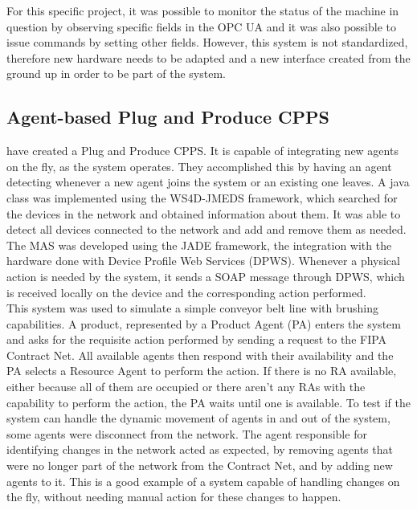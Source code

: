 For this specific project, it was possible to monitor the status of the machine in question by observing specific fields in the OPC UA and it was also possible to issue commands by setting other fields. However, this system is not standardized, therefore new hardware needs to be adapted and a new interface created from the ground up in order to be part of the system.
 
\subsection{Agent-based Plug and Produce CPPS}

\citeauthor{8972169} \cite{8972169} have created a Plug and Produce CPPS. It is capable of integrating new agents on the fly, as the system operates. They accomplished this by having an agent detecting whenever a new agent joins the system or an existing one leaves. A java class was implemented using the WS4D-JMEDS framework, which searched for the devices in the network and obtained information about them. It was able to detect all devices connected to the network and add and remove them as needed.\\

The MAS was developed using the JADE framework, the integration with the hardware done with Device Profile Web Services (DPWS). Whenever a physical action is needed by the system, it sends a SOAP message through DPWS, which is received locally on the device and the corresponding action performed.\\

This system was used to simulate a simple conveyor belt line with brushing capabilities. A product, represented by a Product Agent (PA) enters the system and asks for the requisite action performed by sending a request to the FIPA Contract Net. All available agents then respond with their availability and the PA selects a Resource Agent to perform the action. If there is no RA available, either because all of them are occupied or there aren't any RAs with the capability to perform the action, the PA waits until one is available.
To test if the system can handle the dynamic movement of agents in and out of the system, some agents were disconnect from the network. The agent responsible for identifying changes in the network acted as expected, by removing agents that were no longer part of the network from the Contract Net, and by adding new agents to it.
This is a good example of a system capable of handling changes on the fly, without needing manual action for these changes to happen.


